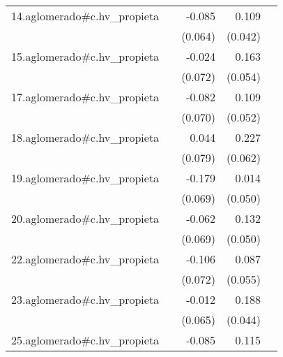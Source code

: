 {\begin{longtable}{l*{4}{D{.}{.}{-1}}}
\addlinespace
14.aglomerado#c.hv\_propieta&                     &      -0.085         &       0.109\sym{**} &                     \\
            &                     &     (0.064)         &     (0.042)         &                     \\
\addlinespace
15.aglomerado#c.hv\_propieta&                     &      -0.024         &       0.163\sym{**} &                     \\
            &                     &     (0.072)         &     (0.054)         &                     \\
\addlinespace
17.aglomerado#c.hv\_propieta&                     &      -0.082         &       0.109\sym{*}  &                     \\
            &                     &     (0.070)         &     (0.052)         &                     \\
\addlinespace
18.aglomerado#c.hv\_propieta&                     &       0.044         &       0.227\sym{***}&                     \\
            &                     &     (0.079)         &     (0.062)         &                     \\
\addlinespace
19.aglomerado#c.hv\_propieta&                     &      -0.179\sym{**} &       0.014         &                     \\
            &                     &     (0.069)         &     (0.050)         &                     \\
\addlinespace
20.aglomerado#c.hv\_propieta&                     &      -0.062         &       0.132\sym{**} &                     \\
            &                     &     (0.069)         &     (0.050)         &                     \\
\addlinespace
22.aglomerado#c.hv\_propieta&                     &      -0.106         &       0.087         &                     \\
            &                     &     (0.072)         &     (0.055)         &                     \\
\addlinespace
23.aglomerado#c.hv\_propieta&                     &      -0.012         &       0.188\sym{***}&                     \\
            &                     &     (0.065)         &     (0.044)         &                     \\
\addlinespace
25.aglomerado#c.hv\_propieta&                     &      -0.085         &       0.115\sym{*}  &                     \\

\end{longtable}}
